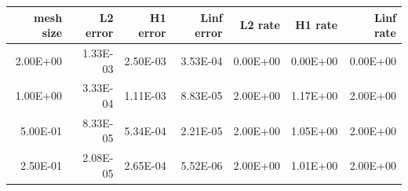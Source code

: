 \begin{tabular}{rrrrrrr}
\toprule
mesh size & L2 error & H1 error & Linf error & L2 rate & H1 rate & Linf rate \\
\midrule
2.00E+00 & 1.33E-03 & 2.50E-03 & 3.53E-04 & 0.00E+00 & 0.00E+00 & 0.00E+00 \\
1.00E+00 & 3.33E-04 & 1.11E-03 & 8.83E-05 & 2.00E+00 & 1.17E+00 & 2.00E+00 \\
5.00E-01 & 8.33E-05 & 5.34E-04 & 2.21E-05 & 2.00E+00 & 1.05E+00 & 2.00E+00 \\
2.50E-01 & 2.08E-05 & 2.65E-04 & 5.52E-06 & 2.00E+00 & 1.01E+00 & 2.00E+00 \\
\bottomrule
\end{tabular}

